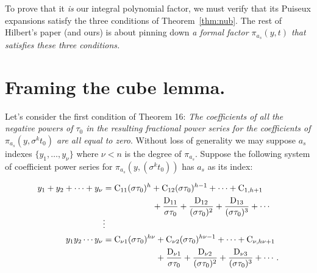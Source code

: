 \documentclass{article}
\theoremstyle{plain}
\theoremstyle{definition}
\begin{document}
\begin{center}
\end{center}



\noindent 
To prove that it \emph{is} our integral polynomial factor, we must
verify that its Puiseux 
expansions satisfy 
the three conditions of
Theorem~\ref{thm:nub}. The rest of Hilbert's paper (and ours) is 
about pinning down \emph{a formal factor $\pi_{a_{s}}(y,t)$ that satisfies these three conditions.}



\section{Framing the cube lemma.}
\label{sec:framing}

Let's consider the first condition of Theorem 16: \emph{The coefficients of all the
\emph{negative} powers of $\tau_0$ in the resulting fractional power
series for the coefficients of $\pi_{a_s}(y,\sigma^kt_0)$ are all
equal to zero}. 
Without loss of generality we may suppose $a_s$ indexes $\{y_1,\dots,y_{\nu}\}$ where $\nu < n$ is the degree of $\pi_{a_s}$.
Suppose the following system of coefficient power
series for $\pi_{a_s}(y,(\sigma^kt_0))$ has $a_s$ as its index:

\begin{align*}
y_1 + y_2 +\cdots+ y_\nu 
&= \mathrm{C}_{11}(\sigma\tau_0)^h 
+ \mathrm{C}_{12}(\sigma\tau_0)^{h-1} +\cdots+ \mathrm{C}_{1,h+1} 
\\
&\hspace*{5.8em}
+ \frac{\mathrm{D}_{11}}{\sigma\tau_0} 
+ \frac{\mathrm{D}_{12}}{(\sigma\tau_0)^2} 
+ \frac{\mathrm{D}_{13}}{(\sigma\tau_0)^3} +\cdots
\\[-2\jot]
 & \vdots
\\
y_1y_2\cdots y_\nu 
&= \mathrm{C}_{\nu1}(\sigma\tau_0)^{h\nu} 
+ \mathrm{C}_{\nu2}(\sigma\tau_0)^{h\nu-1} 
+\cdots+ \mathrm{C}_{\nu,h\nu+1} 
\\
&\hspace*{6.2em}
+ \frac{\mathrm{D}_{\nu1}}{\sigma\tau_0} 
+ \frac{\mathrm{D}_{\nu2}}{(\sigma\tau_0)^2} 
+ \frac{\mathrm{D}_{\nu3}}{(\sigma\tau_0)^3} +\cdots .
\end{align*}
\end{document}
